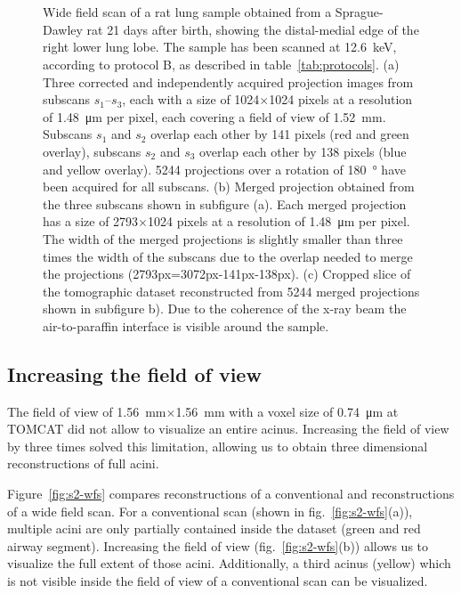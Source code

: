 	\begin{figure}[htp]%
		\\%
		\\%
			\caption{Wide field scan of a rat lung sample obtained from a Sprague-Dawley rat 21 days after birth, showing the distal-medial edge of the right lower lung lobe. The sample has been scanned at \SI{12.6}{\kilo\electronvolt}, according to protocol B, as described in table~\ref{tab:protocols}. %
		(a) Three corrected and independently acquired projection images from subscans $s_1$--$s_3$, each with a size of 1024\(\times\)1024 pixels at a resolution of \SI{1.48}{\micro\meter} per pixel, each covering a field of view of \SI{1.52}{\milli\meter}. Subscans $s_1$ and $s_2$ overlap each other by 141 pixels (red and green overlay), subscans $s_2$ and $s_3$ overlap each other by 138 pixels (blue and yellow overlay). 5244 projections over a rotation of \SI{180}{\degree} have been acquired for all subscans. %
		(b) Merged projection obtained from the three subscans shown in subfigure (a). Each merged projection has a size of 2793\(\times\)1024 pixels at a resolution of \SI{1.48}{\micro\meter} per pixel. The width of the merged projections is slightly smaller than three times the width of the subscans due to the overlap needed to merge the projections (2793px=3072px-141px-138px). %
		(c) Cropped slice of the tomographic dataset reconstructed from 5244 merged projections shown in subfigure b). Due to the coherence of the x-ray beam the air-to-paraffin interface is visible around the sample.%
		}%
		\label{fig:wide field scan results}%
	\end{figure}
\fi

\subsection{Increasing the field of view}
The field of view of \SI{1.56}{\milli\meter}$\times$\SI{1.56}{\milli\meter} with a voxel size of \SI{0.74}{\micro\meter} at TOMCAT did not allow to visualize an entire acinus. Increasing the field of view by three times solved this limitation, allowing us to obtain three dimensional reconstructions of full acini.

Figure~\ref{fig:s2-wfs} compares reconstructions of a conventional and reconstructions of a wide field scan. For a conventional scan (shown in fig.~\ref{fig:s2-wfs}(a)), multiple acini are only partially contained inside the dataset (green and red airway segment). Increasing the field of view (fig.~\ref{fig:s2-wfs}(b)) allows us to visualize the full extent of those acini. Additionally, a third acinus (yellow) which is not visible inside the field of view of a conventional scan can be visualized.

